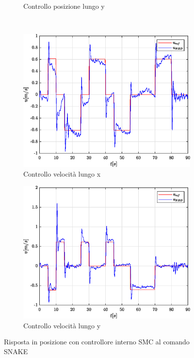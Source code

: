 \begin{figure}
\begin{subfigure}{0.45\textwidth}
		\caption{Controllo posizione lungo y}
		\label{fig:SNAKEerrposySMC}
	\end{subfigure}
	\\
	\begin{subfigure}{0.45\textwidth}
		\centering
		\includegraphics[width=1\textwidth]{Simulazioni/Figure/SMC/SNAKE/PositionControlXVel}
		\caption{Controllo velocità lungo x}
		\label{fig:SNAKEerrvelxSMC}
	\end{subfigure}
	\hfill
	\begin{subfigure}{0.45\textwidth}
		\centering
		\includegraphics[width=1\textwidth]{Simulazioni/Figure/SMC/SNAKE/PositionControlYVel}
		\caption{Controllo velocità lungo y}
		\label{fig:SNAKEerrvelySMC}
	\end{subfigure}
	\caption{Risposta in posizione con controllore interno SMC al comando SNAKE}
\end{figure}


